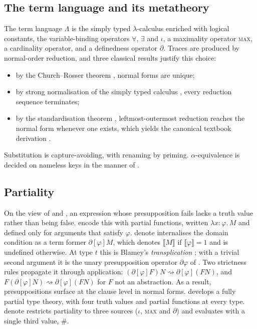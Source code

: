 \documentclass[11pt,a4paper]{article}
\newcommand{\den}[1]{\llbracket #1\rrbracket}
\newcommand{\dn}{\textsf{denote}}
\theoremstyle{definition}
\begin{document}
\subsection{The term language and its metatheory}
The term language $\Lambda$ is the simply typed $\lambda$-calculus \citep{church1936,church1940} enriched with logical constants, the variable-binding operators $\forall$, $\exists$ and $\iota$, a maximality operator \textsc{max}, a cardinality operator, and a definedness operator $\partial$. Traces are produced by normal-order reduction, and three classical results justify this choice:
\begin{itemize}
\item by the Church--Rosser theorem \citep{churchrosser1936}, normal forms are unique;
\item by strong normalisation of the simply typed calculus \citep{tait1967}, every reduction sequence terminates;
\item by the standardisation theorem \citep{barendregt1984}, leftmost-outermost reduction reaches the normal form whenever one exists, which yields the canonical textbook derivation \citep{hindleyseldin2008}.
\end{itemize}
Substitution is capture-avoiding, with renaming by priming. $\alpha$-equivalence is decided on nameless keys in the manner of \citet{debruijn1972}.

\subsection{Partiality}
On the view of \citet{frege1892} and \citet{strawson1950}, an expression whose presupposition fails lacks a truth value rather than being false. \citet{heimkratzer1998} encode this with partial functions, written $\lambda x:\varphi.\,M$ and defined only for arguments that satisfy $\varphi$. \dn{} internalises the domain condition as a term former $\partial[\varphi]M$, which denotes $\den{M}$ if $\den{\varphi}=1$ and is undefined otherwise. At type $t$ this is Blamey's \emph{transplication} \citep{blamey1986}; with a trivial second argument it is the unary presupposition operator $\partial\varphi$ of \citet{beaverkrahmer2001}. Two strictness rules propagate it through application: $(\partial[\varphi]F)N\rightsquigarrow\partial[\varphi](FN)$, and $F(\partial[\varphi]N)\rightsquigarrow\partial[\varphi](FN)$ for $F$ not an abstraction. As a result, presuppositions surface at the clause level in normal forms. \citet{muskens1995} develops a fully partial type theory, with four truth values and partial functions at every type. \dn{} restricts partiality to three sources ($\iota$, \textsc{max} and $\partial$) and evaluates with a single third value, $\#$.
\end{document}
